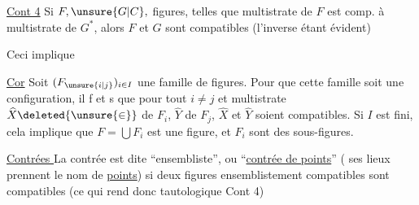 \uline{Cont 4} Si $F,\unsure{G|C},$  figures, telles que  multistrate de $F$ est comp. à  multistrate de $G^{*}$, alors $F$ et $G$ sont compatibles (l'inverse étant évident)


\deleted{\uline{\unsure{Cor}} Si $F,G,H$ sont \unsure{. tout|. trois} $(\unsure{F_i|F_j}\unsure{]|)}$}

 Ceci implique

\uline{Cor} Soit $(F_{\unsure{i|j}})_{i\in I}$ une famille  de figures. Pour que  cette famille soit une configuration, il f et s que pour tout $i\ne j$ et  multistrate $\widehat{X}\deleted{\unsure{\in}}$ de $F_i$, $\widehat{Y}$ de $F_j$, $\widehat{X}$ et $\widehat{Y}$ soient compatibles. Si $I$ est fini, cela implique que $F=\bigcup F_i$ est une figure, et  $F_i$  sont des sous-figures.


\uline{Contrées } La contrée est dite ``ensembliste'', ou ``\uline{contrée de points}'' ( ses lieux prennent le nom de \uline{points}) si deux figures ensemblistement compatibles sont compatibles (ce qui rend donc tautologique Cont 4) 
